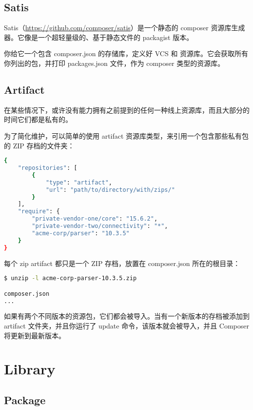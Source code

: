 \subsection{Satis}

Satis（\url{https://github.com/composer/satis}）是一个静态的 composer 资源库生成器。它像是一个超轻量级的、基于静态文件的 packagist 版本。

你给它一个包含 composer.json 的存储库，定义好 VCS 和 资源库。它会获取所有你列出的包，并打印 packages.json 文件，作为 composer 类型的资源库。



\subsection{Artifact}

在某些情况下，或许没有能力拥有之前提到的任何一种线上资源库，而且大部分的时间它们都是私有的。

为了简化维护，可以简单的使用 artifact 资源库类型，来引用一个包含那些私有包的 ZIP 存档的文件夹：

\begin{lstlisting}[language=bash]
{
    "repositories": [
        {
            "type": "artifact",
            "url": "path/to/directory/with/zips/"
        }
    ],
    "require": {
        "private-vendor-one/core": "15.6.2",
        "private-vendor-two/connectivity": "*",
        "acme-corp/parser": "10.3.5"
    }
}
\end{lstlisting}

每个 zip artifact 都只是一个 ZIP 存档，放置在 composer.json 所在的根目录：


\begin{lstlisting}[language=bash]
$ unzip -l acme-corp-parser-10.3.5.zip

composer.json
...
\end{lstlisting}

如果有两个不同版本的资源包，它们都会被导入。当有一个新版本的存档被添加到 artifact 文件夹，并且你运行了 update 命令，该版本就会被导入，并且 Composer 将更新到最新版本。






\section{Library}


\subsection{Package}


